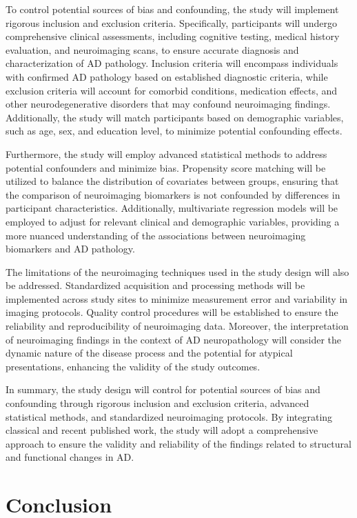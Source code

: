 \documentclass[10pt]{article}
\begin{document}
\begin{sloppypar}
  To control potential sources of bias and confounding, the study will implement rigorous inclusion and exclusion criteria. Specifically, participants will undergo comprehensive clinical assessments, including cognitive testing, medical history evaluation, and neuroimaging scans, to ensure accurate diagnosis and characterization of AD pathology. Inclusion criteria will encompass individuals with confirmed AD pathology based on established diagnostic criteria, while exclusion criteria will account for comorbid conditions, medication effects, and other neurodegenerative disorders that may confound neuroimaging findings. Additionally, the study will match participants based on demographic variables, such as age, sex, and education level, to minimize potential confounding effects.

  Furthermore, the study will employ advanced statistical methods to address potential confounders and minimize bias. Propensity score matching will be utilized to balance the distribution of covariates between groups, ensuring that the comparison of neuroimaging biomarkers is not confounded by differences in participant characteristics. Additionally, multivariate regression models will be employed to adjust for relevant clinical and demographic variables, providing a more nuanced understanding of the associations between neuroimaging biomarkers and AD pathology.

  The limitations of the neuroimaging techniques used in the study design will also be addressed. Standardized acquisition and processing methods will be implemented across study sites to minimize measurement error and variability in imaging protocols. Quality control procedures will be established to ensure the reliability and reproducibility of neuroimaging data. Moreover, the interpretation of neuroimaging findings in the context of AD neuropathology will consider the dynamic nature of the disease process and the potential for atypical presentations, enhancing the validity of the study outcomes.

  In summary, the study design will control for potential sources of bias and confounding through rigorous inclusion and exclusion criteria, advanced statistical methods, and standardized neuroimaging protocols. By integrating classical and recent published work, the study will adopt a comprehensive approach to ensure the validity and reliability of the findings related to structural and functional changes in AD.

  \section{Conclusion}
  \label{sec:conclusion}


\end{sloppypar}
\end{document}
